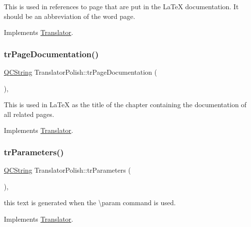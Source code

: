 This is used in references to page that are put in the La\+TeX documentation. It should be an abbreviation of the word page. 

Implements \mbox{\hyperlink{class_translator}{Translator}}.

\mbox{\label{class_translator_polish_ac200e0c70374d86feca6ff709635dda3}} 
\subsubsection{\texorpdfstring{trPageDocumentation()}{trPageDocumentation()}}
{\footnotesize\ttfamily \mbox{\hyperlink{class_q_c_string}{Q\+C\+String}} Translator\+Polish\+::tr\+Page\+Documentation (\begin{DoxyParamCaption}{ }\end{DoxyParamCaption})\hspace{0.3cm}{\ttfamily [inline]}, {\ttfamily [virtual]}}

This is used in La\+TeX as the title of the chapter containing the documentation of all related pages. 

Implements \mbox{\hyperlink{class_translator}{Translator}}.

\mbox{\label{class_translator_polish_a0ddbafd02dba272771f9e332c74d5053}} 
\subsubsection{\texorpdfstring{trParameters()}{trParameters()}}
{\footnotesize\ttfamily \mbox{\hyperlink{class_q_c_string}{Q\+C\+String}} Translator\+Polish\+::tr\+Parameters (\begin{DoxyParamCaption}{ }\end{DoxyParamCaption})\hspace{0.3cm}{\ttfamily [inline]}, {\ttfamily [virtual]}}

this text is generated when the \textbackslash{}param command is used. 

Implements \mbox{\hyperlink{class_translator}{Translator}}.

\mbox{\label{class_translator_polish_a928b04a80930cb2a4bf084fd4c45230a}} 

